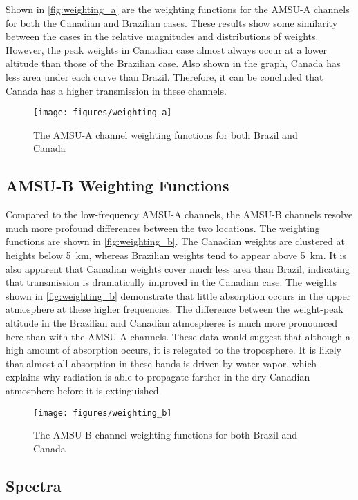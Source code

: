 \documentclass[twocol]{ametsoc}
\begin{document}
Shown in \autoref{fig:weighting_a} are the weighting functions for the AMSU-A channels for both the Canadian and Brazilian cases.
These results show some similarity between the cases in the relative magnitudes and distributions of weights.
However, the peak weights in Canadian case almost always occur at a lower altitude than those of the Brazilian case.
Also shown in the graph, Canada has less area under each curve than Brazil.
Therefore, it can be concluded that Canada has a higher transmission in these channels.

\begin{figure}
	\centering
	\texttt{[image: figures/weighting\_a]}
	\caption{The AMSU-A channel weighting functions for both Brazil and Canada}
	\label{fig:weighting_a}
\end{figure}

\subsection{AMSU-B Weighting Functions}

Compared to the low-frequency AMSU-A channels, the AMSU-B channels resolve much more profound differences between the two locations.
The weighting functions are shown in \autoref{fig:weighting_b}.
The Canadian weights are clustered at heights below 5~km, whereas Brazilian weights tend to appear above 5~km.
It is also apparent that Canadian weights cover much less area than Brazil, indicating that transmission is dramatically improved in the Canadian case.
The weights shown in \autoref{fig:weighting_b} demonstrate that little absorption occurs in the upper atmosphere at these higher frequencies.
The difference between the weight-peak altitude in the Brazilian and Canadian atmospheres is much more pronounced here than with the AMSU-A channels.
These data would suggest that although a high amount of absorption occurs, it is relegated to the troposphere.
It is likely that almost all absorption in these bands is driven by water vapor, which explains why radiation is able to propagate farther in the dry Canadian atmosphere before it is extinguished.

\begin{figure}
	\centering
	\texttt{[image: figures/weighting\_b]}
	\caption{The AMSU-B channel weighting functions for both Brazil and Canada}
	\label{fig:weighting_b}
\end{figure}

\subsection{Spectra}
\end{document}
